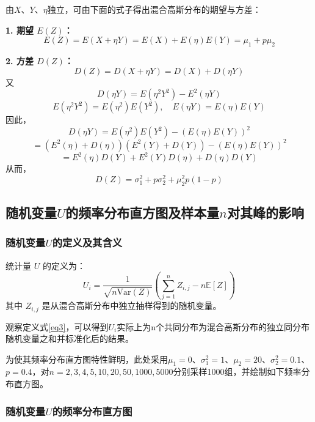 \documentclass{article}
\begin{document}
由$X$、$Y$、$\eta$独立，可由下面的式子得出混合高斯分布的期望与方差：

\textbf{1. 期望 $E(Z)$：}
\[
E(Z) = E(X + \eta Y) = E(X) + E(\eta)E(Y) = \mu_1 + p \mu_2
\]

\textbf{2. 方差 $D(Z)$：}
\[
D(Z) = D(X + \eta Y) = D(X) + D(\eta Y)
\]
又
\[
D(\eta Y) = E(\eta^2 Y^2) - E^2(\eta Y)
\]
\[
E(\eta^2 Y^2) = E(\eta^2)E(Y^2), \quad E(\eta Y) = E(\eta)E(Y)
\]
因此，
\[
D(\eta Y) = E(\eta^2)E(Y^2) - (E(\eta)E(Y))^2
\]
\[
= (E^2(\eta) + D(\eta))(E^2(Y) + D(Y)) - (E(\eta)E(Y))^2
\]
\[
= E^2(\eta)D(Y) + E^2(Y)D(\eta) + D(\eta)D(Y)
\]
从而，
\[
D(Z) = \sigma_1^2 + p \sigma_2^2 + \mu_2^2 p (1 - p)
\]

\subsection{随机变量$U$的频率分布直方图及样本量$n$对其峰的影响}

\subsubsection{\texorpdfstring{随机变量$U$的定义及其含义}{随机变量U的定义及其含义}}

统计量 $U$ 的定义为：
\begin{equation}
U_i = \frac{1}{\sqrt{n \text{Var}(Z)}} \left( \sum_{j=1}^n Z_{i,j} - n \mathbb{E}[Z] \right)
\label{eq3}
\end{equation}
其中 $Z_{i,j}$ 是从混合高斯分布中独立抽样得到的随机变量。

观察定义式\ref{eq3}，可以得到$U_i$实际上为n个共同分布为混合高斯分布的独立同分布随机变量之和并标准化后的结果。

为使其频率分布直方图特性鲜明，此处采用$\mu_1=0$、$\sigma_1^2=1$、$\mu_2=20$、$\sigma_2^2=0.1$、$p=0.4$，对$n=2,3,4,5,10,20,50,1000,5000$分别采样1000组，并绘制如下频率分布直方图。

\subsubsection{\texorpdfstring{随机变量$U$的频率分布直方图}{随机变量U的频率分布直方图}}
\end{document}
